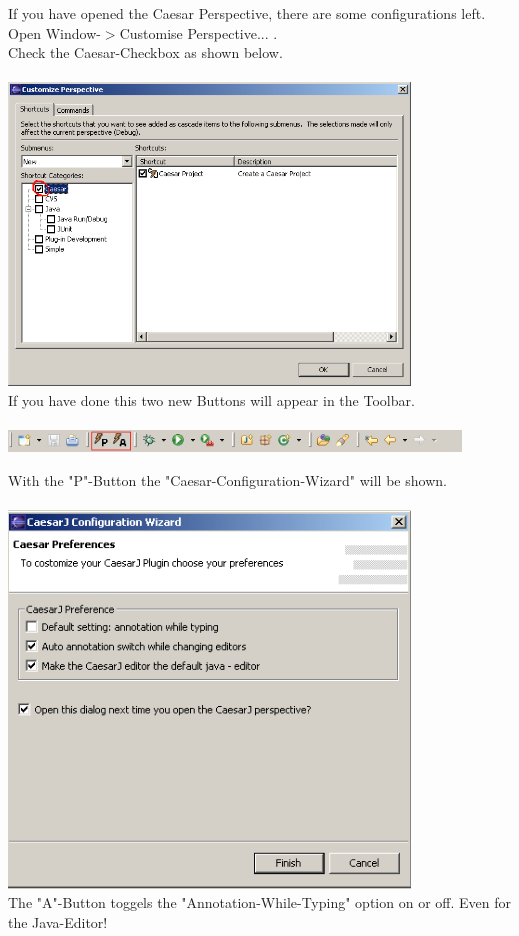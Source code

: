 If you have opened the Caesar Perspective, there are some configurations left. Open Window-$>$Customise Perspective... .\\ Check the Caesar-Checkbox as shown below.\\\\
\includegraphics[width=0.80\textwidth]{images/propert.png}\\

If you have done this two new Buttons will appear in the Toolbar.\\\\
\includegraphics[width=0.90\textwidth]{images/toolbar.png}\newpage

With the "P"-Button the "Caesar-Configuration-Wizard" will be shown.\\\\
\includegraphics[width=0.80\textwidth]{images/view_properties.png}\\

The "A"-Button toggels the "Annotation-While-Typing" option on or off. Even for the Java-Editor!


